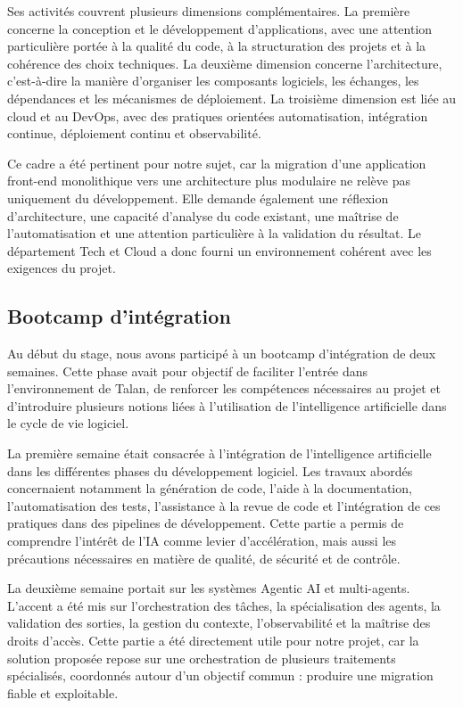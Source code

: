 Ses activités couvrent plusieurs dimensions complémentaires. La première concerne la conception et le développement d'applications, avec une attention particulière portée à la qualité du code, à la structuration des projets et à la cohérence des choix techniques. La deuxième dimension concerne l'architecture, c'est-à-dire la manière d'organiser les composants logiciels, les échanges, les dépendances et les mécanismes de déploiement. La troisième dimension est liée au cloud et au DevOps, avec des pratiques orientées automatisation, intégration continue, déploiement continu et observabilité.

Ce cadre a été pertinent pour notre sujet, car la migration d'une application front-end monolithique vers une architecture plus modulaire ne relève pas uniquement du développement. Elle demande également une réflexion d'architecture, une capacité d'analyse du code existant, une maîtrise de l'automatisation et une attention particulière à la validation du résultat. Le département Tech et Cloud a donc fourni un environnement cohérent avec les exigences du projet.

\subsection{Bootcamp d'intégration}

Au début du stage, nous avons participé à un bootcamp d'intégration de deux semaines. Cette phase avait pour objectif de faciliter l'entrée dans l'environnement de Talan, de renforcer les compétences nécessaires au projet et d'introduire plusieurs notions liées à l'utilisation de l'intelligence artificielle dans le cycle de vie logiciel.

La première semaine était consacrée à l'intégration de l'intelligence artificielle dans les différentes phases du développement logiciel. Les travaux abordés concernaient notamment la génération de code, l'aide à la documentation, l'automatisation des tests, l'assistance à la revue de code et l'intégration de ces pratiques dans des pipelines de développement. Cette partie a permis de comprendre l'intérêt de l'IA comme levier d'accélération, mais aussi les précautions nécessaires en matière de qualité, de sécurité et de contrôle.

La deuxième semaine portait sur les systèmes Agentic AI et multi-agents. L'accent a été mis sur l'orchestration des tâches, la spécialisation des agents, la validation des sorties, la gestion du contexte, l'observabilité et la maîtrise des droits d'accès. Cette partie a été directement utile pour notre projet, car la solution proposée repose sur une orchestration de plusieurs traitements spécialisés, coordonnés autour d'un objectif commun : produire une migration fiable et exploitable.

